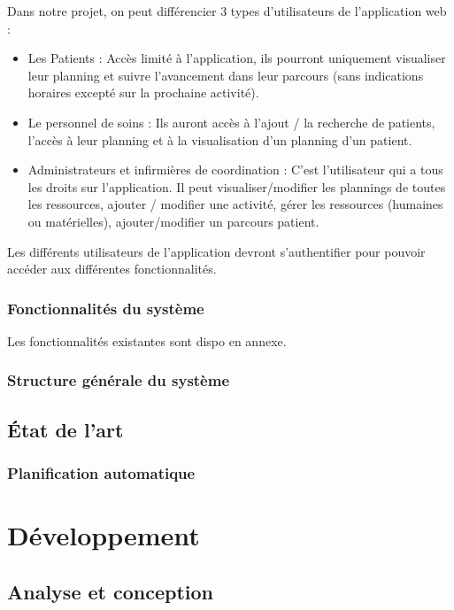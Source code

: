 \documentclass{polytech/polytech}
\begin{document}
Dans notre projet, on peut différencier 3 types d’utilisateurs de l'application web :

\begin{itemize}
	\item Les Patients : Accès limité à l'application, ils pourront uniquement visualiser leur planning et suivre l'avancement dans leur parcours (sans indications horaires excepté sur la prochaine activité).
	\item Le personnel de soins : Ils auront accès à l'ajout / la recherche de patients, l'accès à leur planning et à la visualisation d'un planning d'un patient.
	\item Administrateurs et infirmières de coordination : C'est l'utilisateur qui a tous les droits sur l'application. Il peut visualiser/modifier les plannings de toutes les ressources, ajouter / modifier une activité, gérer les ressources (humaines ou matérielles), ajouter/modifier un parcours patient.
\end{itemize}

Les différents utilisateurs de l'application devront s'authentifier pour pouvoir accéder aux différentes fonctionnalités.


\section{Fonctionnalités du système}


Les fonctionnalités existantes sont dispo en annexe.



\section{Structure générale du système}


\chapter{État de l'art}


\section{Planification automatique}


\part{Développement}


\chapter{Analyse et conception}
\end{document}
